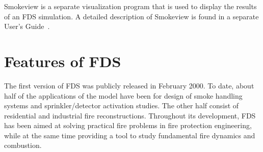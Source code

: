 \documentclass[11pt]{book}
\begin{document}
Smokeview is a separate visualization program that is used to display the
results of an FDS simulation.
A detailed description of Smokeview is found in
a separate User's Guide~\cite{Smokeview_Users_Guide}.


\section{Features of FDS}

The first version of FDS was publicly released in February 2000.
To date, about half of the applications of the model have been for design of smoke
handling systems and sprinkler/detector activation studies. The other half consist of
residential and industrial fire reconstructions. Throughout its development, FDS has
been aimed at solving practical fire problems in fire protection engineering, while
at the same time providing a tool to study fundamental fire dynamics and combustion.
\end{document}
